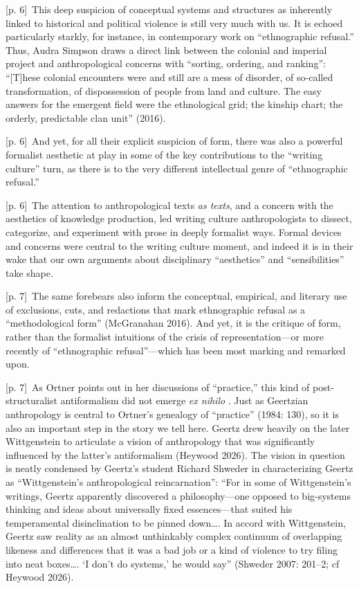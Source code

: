 \documentclass[10pt,a4paper]{article}
\begin{document}
{\scriptsize\color{gray} [p. 6]}\ This deep suspicion of conceptual systems and structures as inherently linked to historical and political violence is still very much with us. It is echoed particularly starkly, for instance, in contemporary work on “ethnographic refusal.” Thus, Audra Simpson draws a direct link between the colonial and imperial project and anthropological concerns with “sorting, ordering, and ranking”: “[T]hese colonial encounters were and still are a mess of disorder, of so-called transformation, of dispossession of people from land and culture. The easy answers for the emergent field were the ethnological grid; the kinship chart; the orderly, predictable clan unit” (2016).\par
{\scriptsize\color{gray} [p. 6]}\ And yet, for all their explicit suspicion of form, there was also a powerful formalist aesthetic at play in some of the key contributions to the “writing culture” turn, as there is to the very different intellectual genre of “ethnographic refusal.”\par
{\scriptsize\color{gray} [p. 6]}\ The attention to anthropological texts \textit{as texts}, and a concern with the aesthetics of knowledge production, led writing culture anthropologists to dissect, categorize, and experiment with prose in deeply formalist ways. Formal devices and concerns were central to the writing culture moment, and indeed it is in their wake that our own arguments about disciplinary “aesthetics” and “sensibilities” take shape.\par
{\scriptsize\color{gray} [p. 7]}\ The same forebears also inform the conceptual, empirical, and literary use of exclusions, cuts, and redactions that mark ethnographic refusal as a “methodological form” (McGranahan 2016). And yet, it is the critique of form, rather than the formalist intuitions of the crisis of representation—or more recently of “ethnographic refusal”—which has been most marking and remarked upon.\par
{\scriptsize\color{gray} [p. 7]}\ As Ortner points out in her discussions of “practice,” this kind of post-structuralist antiformalism did not emerge \textit{ex nihilo} . Just as Geertzian anthropology is central to Ortner’s genealogy of “practice” (1984: 130), so it is also an important step in the story we tell here. Geertz drew heavily on the later Wittgenstein to articulate a vision of anthropology that was significantly influenced by the latter’s antiformalism (Heywood 2026). The vision in question is neatly condensed by Geertz’s student Richard Shweder in characterizing Geertz as “Wittgenstein’s anthropological reincarnation”: “For in some of Wittgenstein’s writings, Geertz apparently discovered a philosophy—one opposed to big-systems thinking and ideas about universally fixed essences—that suited his temperamental disinclination to be pinned down…. In accord with Wittgenstein, Geertz saw reality as an almost unthinkably complex continuum of overlapping likeness and differences that it was a bad job or a kind of violence to try filing into neat boxes…. ‘I don’t do systems,’ he would say” (Shweder 2007: 201–2; cf Heywood 2026).\par
\end{document}
